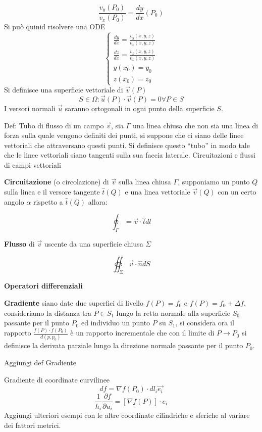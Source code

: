$$
\frac{v_y(P_0)}{v_x(P_0)} = \frac{dy}{dx}(P_0)
$$
Si può quinid risolvere una ODE
$$
\begin{cases}
\frac{dy}{dx} = \frac{v_y(x,y,z)}{v_x(x,y,z)} \\
\frac{dz}{dx} = \frac{v_z(x,y,z)}{v_x(x,y,z)}\\
y(x_0) = y_0 \\
z(x_0) = z_0
\end{cases}
$$
Si definisce una superficie vettoriale di $\vec{v}(P)$
$$
S\in \Omega: \vec{u}(P)\cdot\vec{v}(P) = 0 \forall P \in S
$$
I versori normali $\vec{u}$ saranno ortogonali in ogni punto della superficie $S$.

Def: Tubo di flusso di un campo $\vec{v}$, sia $\Gamma$ una linea chiusa che non sia una linea di forza
sulla quale vengono definiti dei punti, si suppone che ci siano delle linee vettoriali che attraversano
questi punti. Si definisce questo ``tubo'' in modo tale che le linee vettoriali siano tangenti sulla sua faccia laterale.
\newpage
Circuitazioni e flussi di campi vettoriali

\textbf{Circuitazione} (o circolazione) di $\vec{v}$ sulla linea chiusa $\Gamma$, supponiamo un punto $Q$ sulla 
linea e il versore tangente $\hat{t}(Q)$ e una linea vettoriale $\vec{v}(Q)$ con un certo angolo
$\alpha$ rispetto a $\hat{t}(Q)$ allora:

$$
\oint_{\Gamma} = \vec{v}\cdot\hat{t}dl 
$$

\textbf{Flusso} di $\vec{v}$ uscente da una superficie chiusa $\Sigma$

$$
\oiint_{\Sigma}\vec{v}\cdot\hat{n}dS
$$

\textbf{Operatori differenziali}

\textbf{Gradiente} siano date due superfici di livello $f(P) = f_0$ e $f(P) = f_0 + \Delta f$, consideriamo la distanza tra $P\in S_1$ lungo la retta normale alla superficie $S_0$ passante per il punto 
$P_0$ ed individuo un punto $P$ su $S_1$, si considera ora il rapporto $\frac{f(P)\cdot f(P_0)}{d(p,p_0)}$ è un rapporto incrementale che con il limite di $P\to P_0$ si definisce la derivata parziale lungo la
direzione normale passante per il punto $P_0$.

Aggiungi def Gradiente

Gradiente di coordinate curvilinee
$$
df = \nabla f (P_0) \cdot dl_i\vec{e_i}
$$
$$
\frac{1}{h_i} \frac{\partial f}{\partial u_i} = \left[\nabla f (P)\right]\cdot e_i
$$
Aggiungi ulteriori esempi con le altre coordinate cilindriche e sferiche al variare dei fattori metrici.

